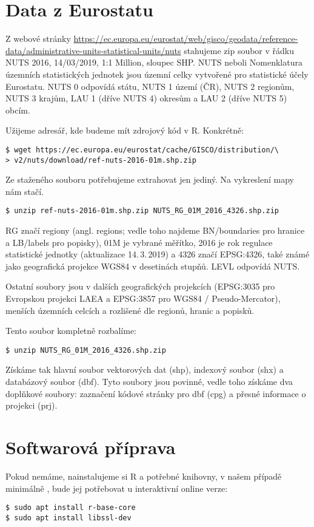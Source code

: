 \section{Data z Eurostatu}
Z webové stránky \url{https://ec.europa.eu/eurostat/web/gisco/geodata/reference-data/administrative-units-statistical-units/nuts} stahujeme zip soubor v řádku NUTS 2016, 14/03/2019, 1:1 Million, sloupec SHP. 
NUTS neboli Nomenklatura územních statistických jednotek jsou územní celky vytvořené pro statistické účely Eurostatu. NUTS 0 odpovídá státu, NUTS 1 území (ČR), NUTS 2 regionům, NUTS 3 krajům, LAU 1 (dříve NUTS 4) okresům a LAU 2 (dříve NUTS 5) obcím.

Užijeme adresář, kde budeme mít zdrojový kód v R. Konkrétně:

\begin{lstlisting}
$ wget https://ec.europa.eu/eurostat/cache/GISCO/distribution/\
> v2/nuts/download/ref-nuts-2016-01m.shp.zip
\end{lstlisting}

Ze staženého souboru potřebujeme extrahovat jen jediný. Na vykreslení mapy nám stačí.

\begin{lstlisting}
$ unzip ref-nuts-2016-01m.shp.zip NUTS_RG_01M_2016_4326.shp.zip
\end{lstlisting}

RG značí regiony (angl. regions; vedle toho najdeme BN/boundaries pro hranice a LB/labels pro popisky), 01M je vybrané měřítko, 2016 je rok regulace statistické jednotky (aktualizace 14.\,3.\,2019) a 4326 značí EPSG:4326, také známé jako geografická projekce WGS84 v desetinách stupňů. LEVL odpovídá NUTS.

Ostatní soubory jsou v dalších geografických projekcích (EPSG:3035 pro Evropskou projekci LAEA a EPSG:3857 pro WGS84 / Pseudo-Mercator), menších územních celcích a rozlišené dle regionů, hranic a popisků.

Tento soubor kompletně rozbalíme:
\begin{lstlisting}
$ unzip NUTS_RG_01M_2016_4326.shp.zip
\end{lstlisting}

Získáme tak hlavní soubor vektorových dat (shp), indexový soubor (shx) a databázový soubor (dbf). Tyto soubory jsou povinné, vedle toho získáme dva doplňkové soubory: zaznačení kódové stránky pro dbf (cpg) a přesné informace o projekci (prj).


\section{Softwarová příprava}
Pokud nemáme, nainstalujeme si R a potřebné knihovny, v našem případě minimálně , bude jej potřebovat  u interaktivní online verze:
\begin{lstlisting}
$ sudo apt install r-base-core
$ sudo apt install libssl-dev 
\end{lstlisting}

